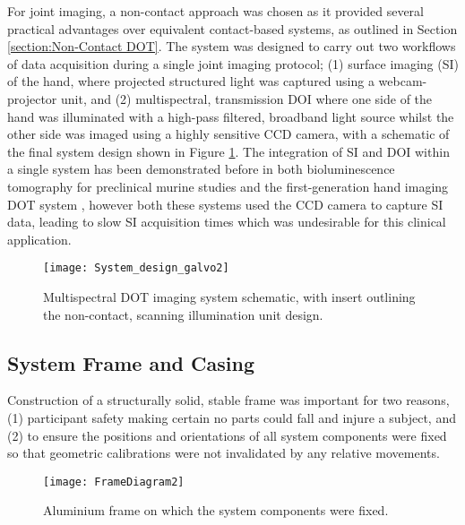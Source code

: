 \documentclass[twoside]{bhamthesis}
\theoremstyle{definition}
\begin{document}
For joint imaging, a non-contact approach was chosen as it provided several practical advantages over equivalent contact-based systems, as outlined in Section \ref{section:Non-Contact DOT}. The system was designed to carry out two workflows of data acquisition during a single joint imaging protocol; (1) surface imaging (SI) of the hand, where projected structured light was captured using a webcam-projector unit, and (2) multispectral, transmission DOI where one side of the hand was illuminated with a high-pass filtered, broadband light source whilst the other side was imaged using a highly sensitive CCD camera, with a schematic of the final system design shown in Figure \ref{fig:final_system_design}. The integration of SI and DOI within a single system has been demonstrated before in both bioluminescence tomography for preclinical murine studies \cite{guggenheim2013multi} and the first-generation hand imaging DOT system \cite{wu2016development}, however both these systems used the CCD camera to capture SI data, leading to slow SI acquisition times which was undesirable for this clinical application.

\begin{figure}[!ht]
\centering
  \texttt{[image: System\_design\_galvo2]}
\caption{Multispectral DOT imaging system schematic, with insert outlining the non-contact, scanning illumination unit design.}
  \label{fig:final_system_design}
\end{figure}

\subsection{System Frame and Casing}

Construction of a structurally solid, stable frame was important for two reasons, (1) participant safety making certain no parts could fall and injure a subject, and (2) to ensure the positions and orientations of all system components were fixed so that geometric calibrations were not invalidated by any relative movements. 

\begin{figure}[!ht]
\centering
  \texttt{[image: FrameDiagram2]}
\caption{Aluminium frame on which the system components were fixed.}
  \label{fig:FrameDiagram2}
\end{figure} 
\end{document}
